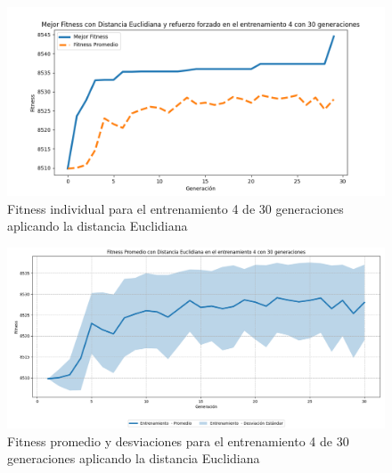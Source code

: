 \documentclass[lettersize, journal]{IEEEtran}
\begin{document}
\begin{figure}[H]
    \centering
    \includegraphics[width=0.9 \linewidth]{Euclidiana/Fitness_individual_30/Fitness_4_Eucli_30Gen.png}
    \caption{Fitness individual para el entrenamiento 4 de 30 generaciones aplicando la distancia Euclidiana}
    \label{fig:eucli_4_30}
\end{figure}
\begin{figure}[H]
    \centering
    \includegraphics[width=0.9 \linewidth]{Euclidiana/Fitness_individual_30/Fitness_4_Eucli_30Gen_Sombra.png}
    \caption{Fitness promedio y desviaciones para el entrenamiento 4 de 30 generaciones aplicando la distancia Euclidiana}
    \label{fig:eucli_4_30_sombra}
\end{figure}

\end{document}
